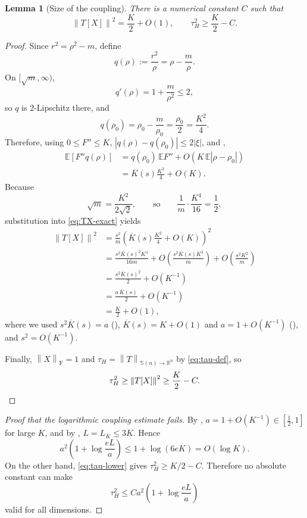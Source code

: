 \documentclass[11pt]{article}
\theoremstyle{plain}
\newtheorem{lemma}[theorem]{Lemma}
\theoremstyle{definition}
\theoremstyle{remark}
\newcommand{\R}{\mathbb{R}}
\newcommand{\E}{\mathbb{E}}
\newcommand{\Sym}{\mathbb{S}}
\newcommand{\1}{\mathbf{1}}
\newcommand{\norm}[1]{\left\lVert #1\right\rVert}
\newcommand{\abs}[1]{\left\lvert #1\right\rvert}
\begin{document}
\begin{lemma}[Size of the coupling]
\label{lem:TX-size}
There is a numerical constant $C$ such that
\begin{equation}
    \norm{T[X]}^2
    =
    \frac K2+O(1),
    \qquad
    \tau_H^2
    \geq
    \frac K2-C.
    \label{eq:tau-lower}
\end{equation}
\end{lemma}

\begin{proof}
Since $r^2=\rho^2-m$, define
\[
    q(\rho):=\frac{r^2}{\rho}=\rho-\frac m\rho.
\]
On $[\sqrt m,\infty)$,
\[
    q'(\rho)=1+\frac m{\rho^2}\leq2,
\]
so $q$ is $2$-Lipschitz there, and
\[
    q(\rho_0)
    =
    \rho_0-\frac m{\rho_0}
    =
    \frac{\rho_0}{2}
    =
    \frac{K^2}{4}.
\]
Therefore, using $0\leq F''\leq K$, $\abs{q(\rho)-q(\rho_0)}\leq2\abs\xi$,
and ,
\begin{align}
    \E[F''q(\rho)]
    &=
    q(\rho_0)\,\E F''
    +
    O\!\left(K\,\E\abs{\rho-\rho_0}\right)
    \nonumber\\
    &=
    \overline K(s)\frac{K^2}{4}
    +
    O(K).
    \label{eq:Fppq}
\end{align}
Because
\[
    \sqrt m=\frac{K^2}{2\sqrt2},
    \qquad\text{so}\qquad
    \frac1m\cdot\frac{K^4}{16}=\frac12,
\]
substitution into \eqref{eq:TX-exact} yields
\begin{align*}
    \norm{T[X]}^2
    &=
    \frac{s^2}{m}
    \left(
        \overline K(s)\frac{K^2}{4}+O(K)
    \right)^2\\
    &=
    \frac{s^2\overline K(s)^2K^4}{16m}
    +O\!\left(\frac{s^2\overline K(s)K^3}{m}\right)
    +O\!\left(\frac{s^2K^2}{m}\right)\\
    &=
    \frac{s^2\overline K(s)^2}{2}+O(K^{-1})\\
    &=
    \frac{a\,\overline K(s)}{2}+O(K^{-1})\\
    &=
    \frac K2+O(1),
\end{align*}
where we used $s^2\overline K(s)=a$ (),
$\overline K(s)=K+O(1)$ and $a=1+O(K^{-1})$ (),
and $s^2=O(K^{-1})$.

Finally, $\norm X_{\mathrm F}=1$ and
$\tau_H=\norm T_{\Sym(n)\to\R^n}$ by \eqref{eq:tau-def}, so
\[
    \tau_H^2
    \geq
    \norm{T[X]}^2
    \geq
    \frac K2-C.
    \qedhere
\]
\end{proof}

\begin{proof}[Proof that the logarithmic coupling estimate fails]
By , $a=1+O(K^{-1})\in[\tfrac12,1]$ for large $K$, and by
, $L=L_K\leq3K$. Hence
\[
    a^2\left(1+\log\frac{eL}{a}\right)
    \leq
    1+\log(6eK)
    =
    O(\log K).
\]
On the other hand, \eqref{eq:tau-lower} gives
$\tau_H^2\geq K/2-C$. Therefore no absolute constant can make
\[
    \tau_H^2
    \leq
    C a^2\left(1+\log\frac{eL}{a}\right)
\]
valid for all dimensions.
\end{proof}
\end{document}
